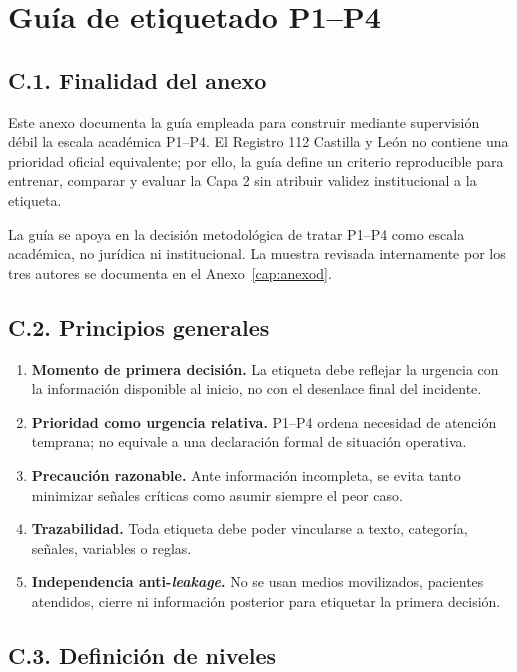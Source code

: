 \chapter{Guía de etiquetado P1--P4}
\label{cap:anexoc}

\section*{C.1. Finalidad del anexo}

Este anexo documenta la guía empleada para construir mediante supervisión débil
la escala académica P1--P4. El Registro 112 Castilla y León no contiene una
prioridad oficial equivalente; por ello, la guía define un criterio reproducible para
entrenar, comparar y evaluar la Capa 2 sin atribuir validez institucional a la etiqueta.

La guía se apoya en la decisión metodológica de tratar
P1--P4 como escala académica, no jurídica ni institucional.
La muestra revisada internamente por los tres autores se documenta en el
Anexo~\ref{cap:anexod}.

\section*{C.2. Principios generales}

\begin{enumerate}
    \item \textbf{Momento de primera decisión.} La etiqueta debe reflejar la urgencia
    con la información disponible al inicio, no con el desenlace final del incidente.
    \item \textbf{Prioridad como urgencia relativa.} P1--P4 ordena necesidad de
    atención temprana; no equivale a una declaración formal de situación operativa.
    \item \textbf{Precaución razonable.} Ante información incompleta, se evita tanto
    minimizar señales críticas como asumir siempre el peor caso.
    \item \textbf{Trazabilidad.} Toda etiqueta debe poder vincularse a texto,
    categoría, señales, variables o reglas.
    \item \textbf{Independencia anti-\textit{leakage}.} No se usan medios movilizados,
    pacientes atendidos, cierre ni información posterior para etiquetar la primera
    decisión.
\end{enumerate}

\section*{C.3. Definición de niveles}

